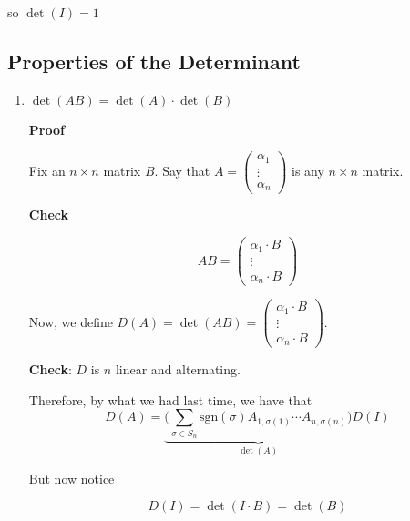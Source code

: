 \documentclass[12pt]{article}
\def\sgn{\text{sgn}}
\begin{document}
  so $\det(I) = 1$


  \subsection{Properties of the Determinant}

  \begin{enumerate}
    \item $\det(AB) = \det(A) \cdot \det(B)$

      {\bf Proof}

      Fix an $n \times n$ matrix $B$. Say that $A = \begin{pmatrix}
        \alpha_1 \\ \vdots \\ \alpha_n
      \end{pmatrix}$ is any $n \times n$ matrix.

      {\bf Check}

      \[
        AB = \begin{pmatrix}
        \alpha_1 \cdot B \\ \vdots \\ \alpha_n \cdot B
      \end{pmatrix}
      \]


      Now, we define $D(A) = \det(AB) = \begin{pmatrix}
        \alpha_1 \cdot B \\ \vdots \\ \alpha_n \cdot B
      \end{pmatrix}$.

      {\bf Check}: $D$ is $n$ linear and alternating.



      Therefore, by what we had last time, we have that
      \[
        D(A) = \underbrace{\Big( \sum_{\sigma \in S_n} \sgn(\sigma) A_{1, \sigma(1)} \cdots
        A_{n, \sigma(n)} \Big)}_{\det(A)} D(I)
      \]

      But now notice

      \[
        D(I) = \det(I \cdot B) = \det(B)
      \]


\end{enumerate}
\end{document}
